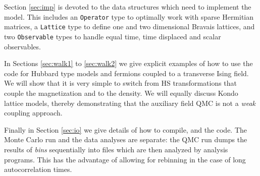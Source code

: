 	   Section \ref{sec:imp} is devoted to the data structures which  need to implement the model.  This includes  an \texttt{Operator} type to  optimally work with sparse Hermitian matrices, a \texttt{Lattice} type  to define one and two dimensional Bravais lattices, and   two   \texttt{Observable} types to handle equal time, time displaced and scalar observables. 
	   
	   In Sections \ref{sec:walk1}  to \ref{sec:walk2}  we give explicit examples of how to use the code for  Hubbard type models and fermions coupled to a transverse Ising field. We will show that it is very simple  to switch from HS transformations that couple the magnetization and to the density.  We will equally discuss Kondo lattice models,  thereby demonstrating that the auxiliary field QMC is  not a {\it weak } coupling approach. 
	   
	   Finally in Section \ref{sec:io} we give details of how to compile, and the code.   The Monte Carlo run and the  data analyses are separate: the QMC run  dumps the results of {\it bins}  sequentially into files  which are then analyzed by  analysis programs. This has the advantage of allowing   for rebinning  in the case of long autocorrelation times. 
		
				


